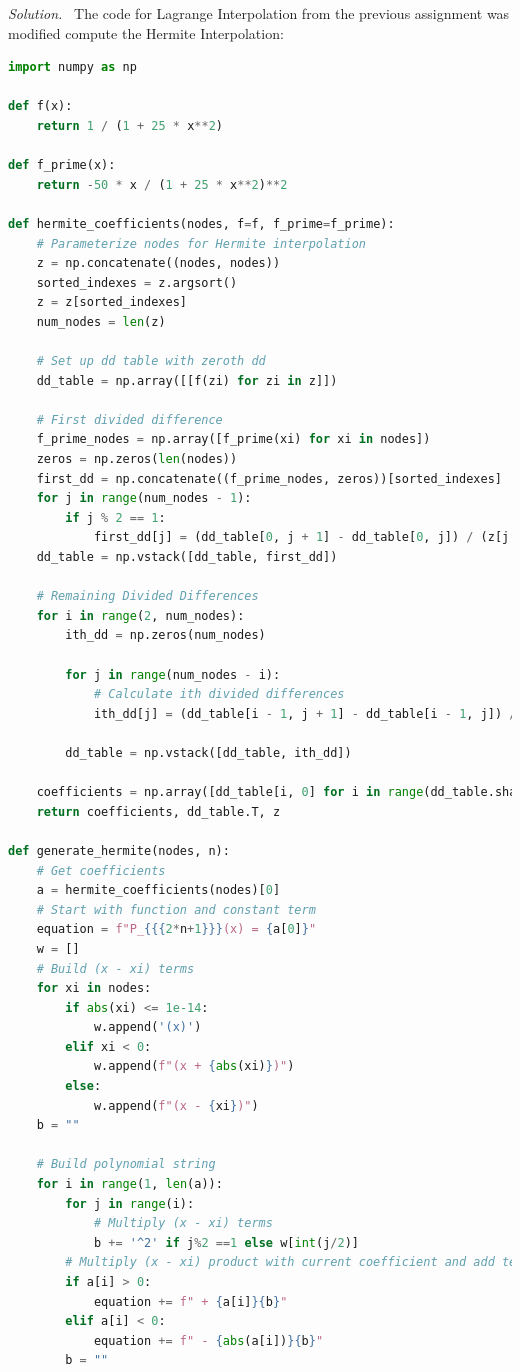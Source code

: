 \documentclass[12pt]{article}
\newcommand{\solution}
    {\par\vspace{0.5em}\noindent\emph{Solution.}\ }
    {\par\vspace{1em}}
\begin{document}
\solution
The code for Lagrange Interpolation from the previous assignment was modified compute the Hermite Interpolation:
\begin{lstlisting}[language=Python, caption=1.3 Python]
import numpy as np

def f(x):
    return 1 / (1 + 25 * x**2)

def f_prime(x):
    return -50 * x / (1 + 25 * x**2)**2

def hermite_coefficients(nodes, f=f, f_prime=f_prime):
    # Parameterize nodes for Hermite interpolation
    z = np.concatenate((nodes, nodes))
    sorted_indexes = z.argsort()
    z = z[sorted_indexes]
    num_nodes = len(z)
    
    # Set up dd table with zeroth dd
    dd_table = np.array([[f(zi) for zi in z]])

    # First divided difference
    f_prime_nodes = np.array([f_prime(xi) for xi in nodes])
    zeros = np.zeros(len(nodes))
    first_dd = np.concatenate((f_prime_nodes, zeros))[sorted_indexes]
    for j in range(num_nodes - 1):
        if j % 2 == 1:
            first_dd[j] = (dd_table[0, j + 1] - dd_table[0, j]) / (z[j + 1] - z[j])
    dd_table = np.vstack([dd_table, first_dd])
    
    # Remaining Divided Differences
    for i in range(2, num_nodes):
        ith_dd = np.zeros(num_nodes)
        
        for j in range(num_nodes - i):
            # Calculate ith divided differences
            ith_dd[j] = (dd_table[i - 1, j + 1] - dd_table[i - 1, j]) / (z[j + i] - z[j])
        
        dd_table = np.vstack([dd_table, ith_dd])

    coefficients = np.array([dd_table[i, 0] for i in range(dd_table.shape[0])])
    return coefficients, dd_table.T, z

def generate_hermite(nodes, n):
    # Get coefficients
    a = hermite_coefficients(nodes)[0]
    # Start with function and constant term
    equation = f"P_{{{2*n+1}}}(x) = {a[0]}"
    w = []
    # Build (x - xi) terms
    for xi in nodes:
        if abs(xi) <= 1e-14:
            w.append('(x)')
        elif xi < 0:
            w.append(f"(x + {abs(xi)})")
        else:
            w.append(f"(x - {xi})")
    b = ""

    # Build polynomial string
    for i in range(1, len(a)):
        for j in range(i):
            # Multiply (x - xi) terms
            b += '^2' if j%2 ==1 else w[int(j/2)]
        # Multiply (x - xi) product with current coefficient and add term
        if a[i] > 0:
            equation += f" + {a[i]}{b}"
        elif a[i] < 0:
            equation += f" - {abs(a[i])}{b}"
        b = ""


\end{lstlisting}
\end{document}
